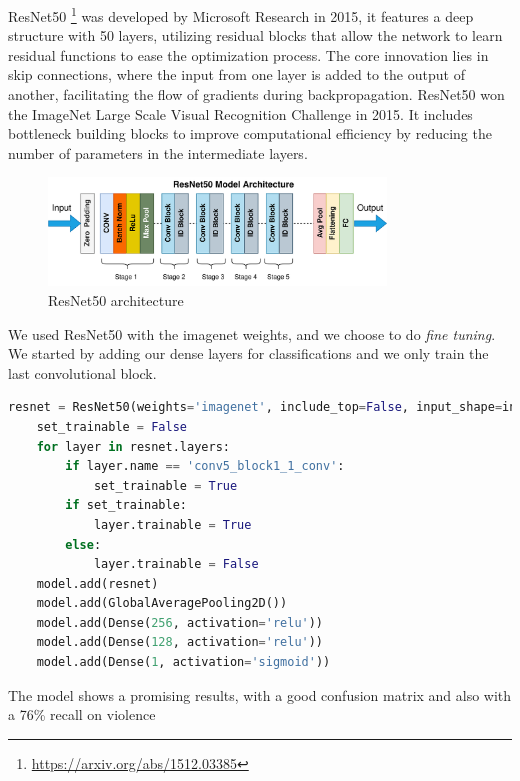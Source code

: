 ResNet50 \footnote{\url{https://arxiv.org/abs/1512.03385}} was developed by Microsoft Research in 2015, it features a deep structure with 50 layers, utilizing residual blocks that allow the network to learn residual functions to ease the optimization process.
The core innovation lies in skip connections, where the input from one layer is added to the output of another, facilitating the flow of gradients during backpropagation.
ResNet50  won the ImageNet Large Scale Visual Recognition Challenge in 2015. It includes bottleneck building blocks to improve computational efficiency by reducing the number of parameters in the intermediate layers.
\begin{figure}[]
    \centering
    \includegraphics[width=0.8\textwidth]{images/ResNet50_architecture.png}
    \caption{ResNet50 architecture}
    \label{fig:ResNet50Arch}
\end{figure}
We used ResNet50 with the imagenet weights, and we choose to do 
\textit{fine tuning}. We started by adding our dense layers for classifications and we only train the last convolutional block.  

\begin{lstlisting}[language=python, caption={ResNet50}, label={lst:resnet50Code}]
    resnet = ResNet50(weights='imagenet', include_top=False, input_shape=input_shape)
    set_trainable = False
    for layer in resnet.layers:
        if layer.name == 'conv5_block1_1_conv':
            set_trainable = True
        if set_trainable:
            layer.trainable = True
        else:
            layer.trainable = False
    model.add(resnet)
    model.add(GlobalAveragePooling2D())
    model.add(Dense(256, activation='relu'))
    model.add(Dense(128, activation='relu'))
    model.add(Dense(1, activation='sigmoid'))
\end{lstlisting}

The model shows a promising results, with a good confusion matrix and also with a 76\% recall on violence

